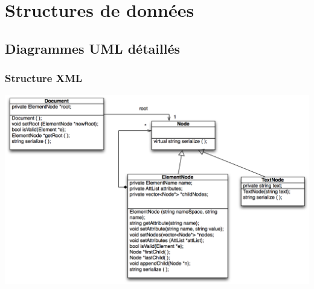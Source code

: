 
\section{Structures de données}
\subsection{Diagrammes UML détaillés}
\subsubsection{Structure XML}
\medskip
\begin {center}
\includegraphics[width=\textwidth]{UMLXML.png}
\end {center}
\medskip
